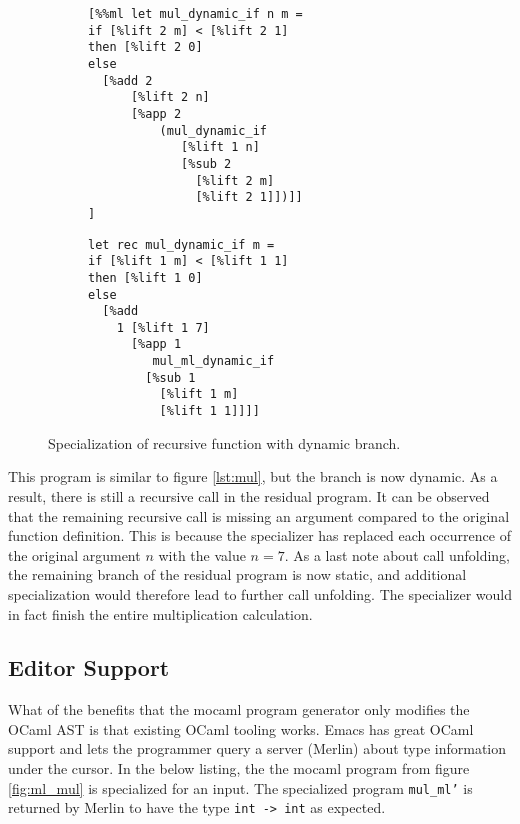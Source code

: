 \begin{figure}[H]
  \centering
  \begin{subfigure}[t]{0.49\linewidth}
\begin{verbatim}
[%%ml let mul_dynamic_if n m =
if [%lift 2 m] < [%lift 2 1]
then [%lift 2 0]
else
  [%add 2
      [%lift 2 n]
      [%app 2
          (mul_dynamic_if                     
             [%lift 1 n]
             [%sub 2
               [%lift 2 m]
               [%lift 2 1]])]]
]
\end{verbatim}
  \end{subfigure}
    \begin{subfigure}[t]{0.49\linewidth}
\begin{verbatim}
let rec mul_dynamic_if m =
if [%lift 1 m] < [%lift 1 1]
then [%lift 1 0]
else
  [%add
    1 [%lift 1 7]
      [%app 1
         mul_ml_dynamic_if
        [%sub 1
          [%lift 1 m]
          [%lift 1 1]]]]
\end{verbatim}
  \end{subfigure}
  \caption{Specialization of recursive function with dynamic branch.}
  \label{fig:dynamic-branch}
\end{figure}

This program is similar to figure \ref{lst:mul}, but the branch is now dynamic. As a result, there is still a recursive call in the residual program. It can be observed that the remaining recursive call is missing an argument compared to the original function definition. This is because the specializer has replaced each occurrence of the original argument $n$ with the value $n=7$. As a last note about call unfolding, the remaining branch of the residual program is now static, and additional specialization would therefore lead to further call unfolding. The specializer would in fact finish the entire multiplication calculation.

\subsection{Editor Support}

What of the benefits that the mocaml program generator only modifies the OCaml AST is that existing OCaml tooling works. Emacs has great OCaml support and lets the programmer query a server (Merlin) about type information under the cursor. In the below listing, the the mocaml program from figure \ref{fig:ml_mul} is specialized for an input. The specialized program \texttt{mul\_ml'} is returned by Merlin to have the type \texttt{int -> int} as expected. 

